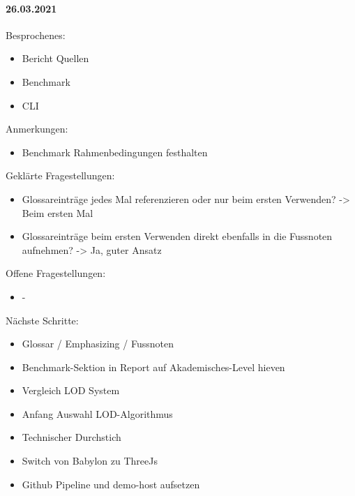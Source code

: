 \paragraph{26.03.2021}
Besprochenes:
\begin{itemize}
  \item Bericht
    \subitem Quellen
  \item Benchmark
  \item CLI
\end{itemize}
Anmerkungen:
\begin{itemize}
  \item Benchmark
    \subitem Rahmenbedingungen festhalten
\end{itemize}
Geklärte Fragestellungen:
\begin{itemize}
  \item Glossareinträge jedes Mal referenzieren oder nur beim ersten Verwenden? -> Beim ersten Mal
  \item Glossareinträge beim ersten Verwenden direkt ebenfalls in die Fussnoten aufnehmen? -> Ja, guter Ansatz
\end{itemize}
Offene Fragestellungen:
\begin{itemize}
  \item -
\end{itemize}
Nächste Schritte:
\begin{itemize}
  \item Glossar / Emphasizing / Fussnoten
  \item Benchmark-Sektion in Report auf Akademisches-Level hieven
  \item Vergleich LOD System
  \item Anfang Auswahl LOD-Algorithmus
  \item Technischer Durchstich
  \item Switch von Babylon zu ThreeJs
  \item Github Pipeline und demo-host aufsetzen
\end{itemize}

\newpage

